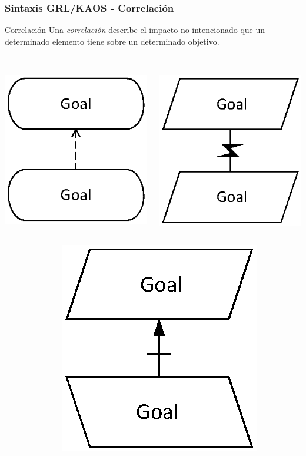 \documentclass[handout,slidestop,xcolor=pst,dvips,blue]{beamer}
\begin{document}
\begin{frame}[c]
    \frametitle{Sintaxis GRL/KAOS - Correlación}
    \begin{block}{Correlación}
        Una \alert{\emph{correlación}} describe el impacto no intencionado que un determinado elemento tiene sobre un determinado objetivo.
        \ \\
        \ \\
        \begin{columns}[c]
            \begin{column}{0.5\linewidth}
                \centering \includegraphics[width=0.35\columnwidth,keepaspectratio=true]{images/objetivos/correlation(GRL).eps}
            \end{column}
            \begin{column}{0.5\linewidth}
                \centering \includegraphics[width=0.35\columnwidth,keepaspectratio=true]{images/objetivos/contribution(KAOS).eps}
            \end{column}
        \end{columns}
        \begin{columns}[c]
            \begin{column}{0.50\linewidth}
            \end{column}
            \begin{column}{0.50\linewidth}
                \centering \includegraphics[width=0.35\columnwidth,keepaspectratio=true]{images/objetivos/contribution(2)(KAOS).eps}
            \end{column}
        \end{columns}
    \end{block}
\end{frame}
\end{document}
